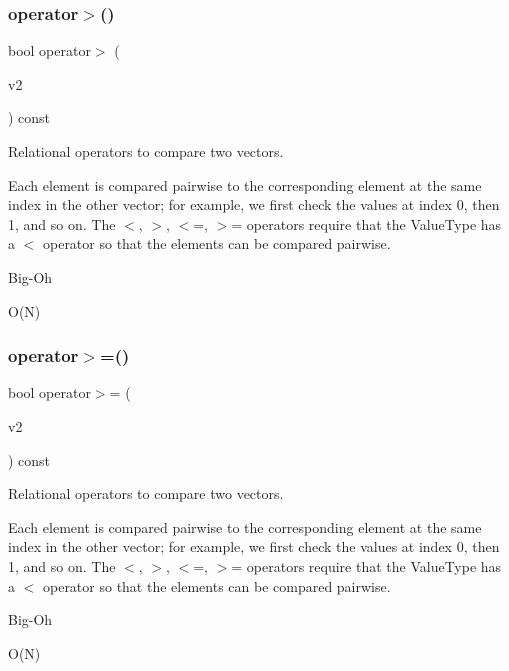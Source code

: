 \subsubsection{\texorpdfstring{operator$>$()}{operator>()}}
{\footnotesize\ttfamily bool operator$>$ (\begin{DoxyParamCaption}\item[{const \mbox{\hyperlink{classVector}{Vector}}$<$ Value\+Type $>$ \&}]{v2 }\end{DoxyParamCaption}) const}



Relational operators to compare two vectors. 

Each element is compared pairwise to the corresponding element at the same index in the other vector; for example, we first check the values at index 0, then 1, and so on. The $<$, $>$, $<$=, $>$= operators require that the Value\+Type has a $<$ operator so that the elements can be compared pairwise. \begin{DoxyRefDesc}{Big-\/\+Oh}
\item[\mbox{\hyperlink{BigOh__BigOh000145}{Big-\/\+Oh}}]O(\+N) \end{DoxyRefDesc}
\mbox{\label{classVector_adaa095641c5fc43f90754d7694784006}} 
\subsubsection{\texorpdfstring{operator$>$=()}{operator>=()}}
{\footnotesize\ttfamily bool operator$>$= (\begin{DoxyParamCaption}\item[{const \mbox{\hyperlink{classVector}{Vector}}$<$ Value\+Type $>$ \&}]{v2 }\end{DoxyParamCaption}) const}



Relational operators to compare two vectors. 

Each element is compared pairwise to the corresponding element at the same index in the other vector; for example, we first check the values at index 0, then 1, and so on. The $<$, $>$, $<$=, $>$= operators require that the Value\+Type has a $<$ operator so that the elements can be compared pairwise. \begin{DoxyRefDesc}{Big-\/\+Oh}
\item[\mbox{\hyperlink{BigOh__BigOh000146}{Big-\/\+Oh}}]O(\+N) \end{DoxyRefDesc}
\mbox{\label{classVector_a7dbb3a92c8b6a08a04b564aed136b870}} 
